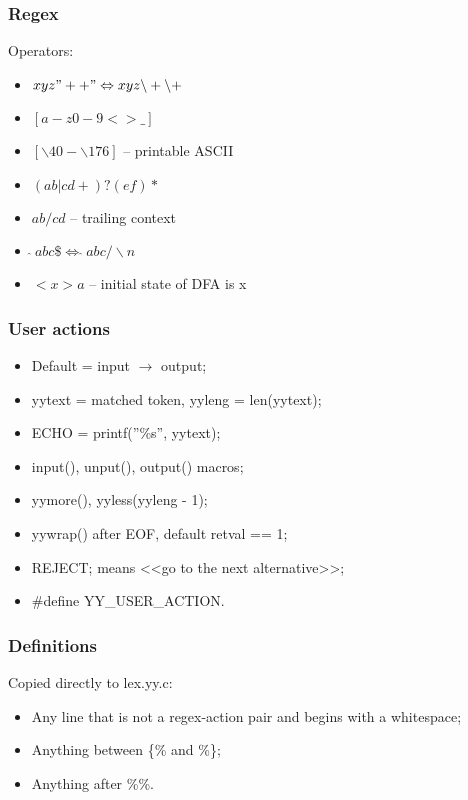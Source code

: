 \documentclass[14pt]{beamer}
\begin{document}
\begin{frame}[fragile]
	
	\frametitle{Regex}	
	
	Operators: 
	
	\begin{itemize}
		\item $xyz"++" \Leftrightarrow xyz \backslash+\backslash+$
		\item $[a-z0-9<>\_]$
		\item $[\backslash40-\backslash176]$ -- printable ASCII
		\item $(ab|cd+)?(ef)*$
		\item $ab/cd$ -- trailing context
		\item $\hat{}\ abc\$ \Leftrightarrow \hat{}\ abc/\backslash n$
		\item $<x>a$ -- initial state of DFA is x
	\end{itemize}
	
	
\end{frame}

\begin{frame}[fragile]
	
	\frametitle{User actions}	
	
	\begin{itemize}
		\item Default = input $\rightarrow$ output;
		\item yytext = matched token, yyleng = len(yytext);
		\item ECHO = printf(''\%s'', yytext);
		\item input(), unput(), output() macros;
		\item yymore(), yyless(yyleng - 1);
		\item yywrap() after EOF, default retval == 1;
		\item REJECT; means <<go to the next alternative>>;
		\item \#define YY\_USER\_ACTION.
	\end{itemize}
	
\end{frame}

\begin{frame}[fragile]
	
	\frametitle{Definitions}	
	
	Copied directly to lex.yy.c:
	\begin{itemize}
		\item Any line that is not a regex-action pair and begins with a whitespace;
		\item Anything between \{\% and \%\};
		\item Anything after \%\%.
	\end{itemize}
	
\end{frame}
\end{document}
